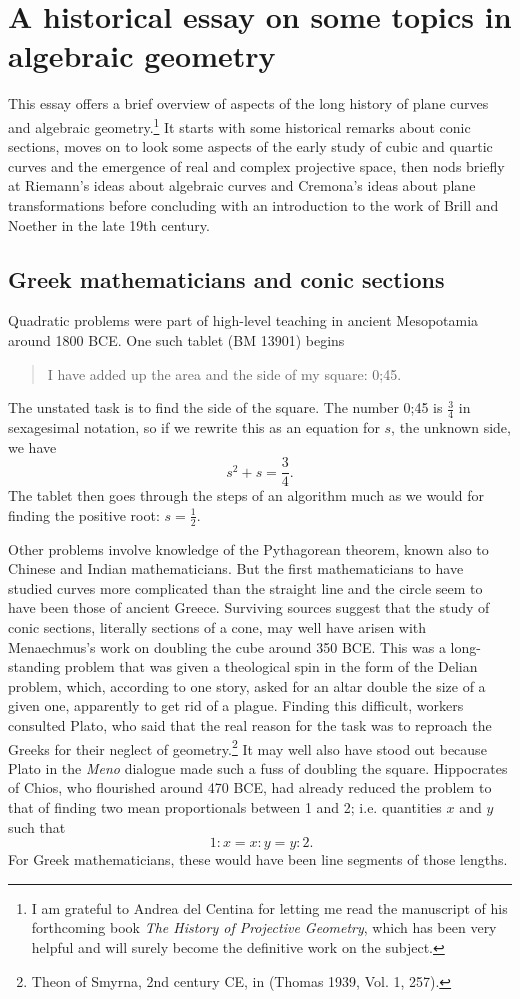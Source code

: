 \chapter{A historical essay on some topics in algebraic geometry}
This essay offers a brief overview of aspects of the long history of plane curves and algebraic geometry.\footnote{I am grateful to Andrea del Centina for letting me read the manuscript of his forthcoming book \emph{The History of Projective Geometry}, which has been very helpful and will surely become the definitive work on the subject.}   It starts with some historical remarks about conic sections, moves on to look some aspects of the early study of cubic and quartic curves and the emergence of real and complex projective space, then nods briefly at Riemann's ideas about algebraic curves and Cremona's ideas about plane transformations before concluding with an introduction to the work of Brill and Noether in the late 19th century. 

\section{Greek mathematicians and conic sections}
Quadratic problems were part of high-level teaching in ancient Mesopotamia around 1800 BCE. One such tablet (BM 13901) begins 
\begin{quote}
I have added up the area and the side of my square: 0;45.
\end{quote}
The unstated task is to find the side of the square.
The number 0;45 is $\frac{3}{4}$ in sexagesimal notation, so if we rewrite this as an equation for $s$, the unknown side, we have
\[s^2 + s = \frac{3}{4}.\]
The tablet then goes through the steps of an algorithm much as we would for finding the positive root: $s = \frac{1}{2}.$ 

Other problems involve knowledge of the Pythagorean theorem, known also to Chinese and Indian mathematicians. But the first mathematicians to have studied curves more complicated than the straight line and the circle seem to have been those of ancient Greece.  Surviving sources suggest that the study of conic sections, literally sections of a cone, may well have arisen with Menaechmus's work on doubling the cube around 350 BCE. This was a long-standing problem that was given a theological spin in the form of the Delian problem, which, according to one story, asked for an altar double the size of a given one, apparently to get rid of a plague. Finding this difficult, workers consulted Plato, who said that the real reason for the task was to reproach the Greeks for their neglect of geometry.\footnote{Theon of Smyrna, 2nd century CE, in (Thomas 1939, Vol. 1, 257).}
It may well also have stood out because Plato in the \emph{Meno} dialogue made such a fuss of doubling the square. Hippocrates of Chios, who flourished around 470 BCE,  had already reduced the problem to that of finding two mean proportionals between 1 and 2; i.e. quantities $x$ and $y$ such that 
\begin{equation}~\label{Menmus}
1:x= x:y = y: 2.
\end{equation}
For Greek mathematicians, these would have been line segments of those lengths. 

